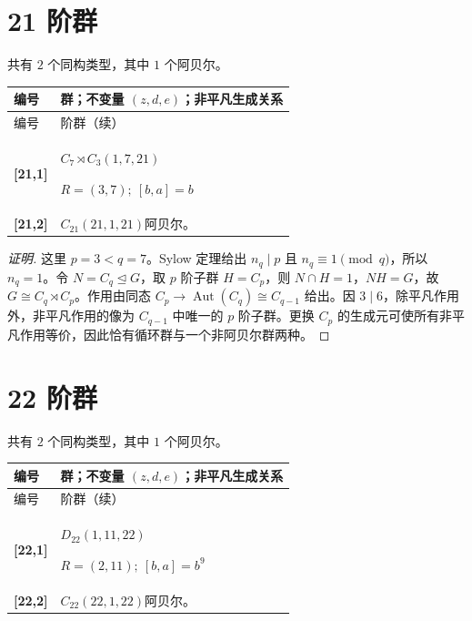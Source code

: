 \documentclass[UTF8,fontset=fandol,11pt,a4paper]{ctexart}
\newcommand{\Aut}{\operatorname{Aut}}\newcommand{\GL}{\operatorname{GL}}\newcommand{\ord}{\operatorname{ord}}\newcommand{\Z}{\mathrm Z}
\begin{document}
\section*{21 阶群}\label{order:21}

共有 $2$ 个同构类型，其中 $1$ 个阿贝尔。

\begingroup\small\setlength{\tabcolsep}{3pt}\renewcommand{\arraystretch}{1.12}

\begin{longtable}{@{}p{17mm}>{\raggedright\arraybackslash}p{141mm}@{}}

\toprule 编号 & 群；不变量 $(z,d,e)$；非平凡生成关系\\\midrule\endfirsthead

\toprule 编号 & 21 阶群（续）\\\midrule\endhead\bottomrule\endfoot

\textbf{[21,1]} & $C_{7}\rtimes C_{3}$\quad $(1,7,21)$\par\(R=(3,7);\allowbreak\ [b,a]=b\)\\[3pt]

\textbf{[21,2]} & $C_{21}$\quad $(21,1,21)$\quad 阿贝尔。\\[3pt]

\end{longtable}\endgroup

\begin{proof}[证明]
这里 $p=3<q=7$。Sylow 定理给出 $n_q\mid p$ 且 $n_q\equiv1\pmod q$，所以 $n_q=1$。令 $N=C_q\trianglelefteq G$，取 $p$ 阶子群 $H=C_p$，则 $N\cap H=1$，$NH=G$，故 $G\cong C_q\rtimes C_p$。作用由同态 $C_p\to\Aut(C_q)\cong C_{q-1}$ 给出。因 $3\mid 6$，除平凡作用外，非平凡作用的像为 $C_{q-1}$ 中唯一的 $p$ 阶子群。更换 $C_p$ 的生成元可使所有非平凡作用等价，因此恰有循环群与一个非阿贝尔群两种。
\end{proof}

\section*{22 阶群}\label{order:22}

共有 $2$ 个同构类型，其中 $1$ 个阿贝尔。

\begingroup\small\setlength{\tabcolsep}{3pt}\renewcommand{\arraystretch}{1.12}

\begin{longtable}{@{}p{17mm}>{\raggedright\arraybackslash}p{141mm}@{}}

\toprule 编号 & 群；不变量 $(z,d,e)$；非平凡生成关系\\\midrule\endfirsthead

\toprule 编号 & 22 阶群（续）\\\midrule\endhead\bottomrule\endfoot

\textbf{[22,1]} & $D_{22}$\quad $(1,11,22)$\par\(R=(2,11);\allowbreak\ [b,a]=b^{9}\)\\[3pt]

\textbf{[22,2]} & $C_{22}$\quad $(22,1,22)$\quad 阿贝尔。\\[3pt]

\end{longtable}\endgroup
\end{document}
